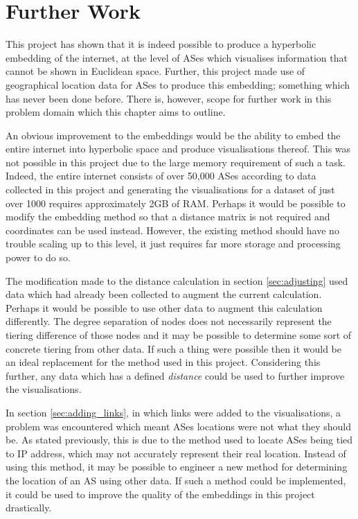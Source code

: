 \chapter{Further Work}

This project has shown that it is indeed possible to produce a hyperbolic embedding of the internet, at the level of ASes which visualises information that cannot be shown in Euclidean space. Further, this project made use of geographical location data for ASes to produce this embedding; something which has never been done before. There is, however, scope for further work in this problem domain which this chapter aims to outline. 

An obvious improvement to the embeddings would be the ability to embed the entire internet into hyperbolic space and produce visualisations thereof. This was not possible in this project due to the large memory requirement of such a task. Indeed, the entire internet consists of over 50,000 ASes according to data collected in this project and generating the visualisations for a dataset of just over 1000 requires approximately 2GB of RAM. Perhaps it would be possible to modify the embedding method so that a distance matrix is not required and coordinates can be used instead. However, the existing method should have no trouble scaling up to this level, it just requires far more storage and processing power to do so.

The modification made to the distance calculation in section \ref{sec:adjusting} used data which had already been collected to augment the current calculation. Perhaps it would be possible to use other data to augment this calculation differently. The degree separation of nodes does not necessarily represent the tiering difference of those nodes and it may be possible to determine some sort of concrete tiering from other data. If such a thing were possible then it would be an ideal replacement for the method used in this project. Considering this further, any data which has a defined \textit{distance} could be used to further improve the visualisations.

In section \ref{sec:adding_links}, in which links were added to the visualisations, a problem was encountered which meant ASes locations were not what they should be. As stated previously, this is due to the method used to locate ASes being tied to IP address, which may not accurately represent their real location. Instead of using this method, it may be possible to engineer a new method for determining the location of an AS using other data. If such a method could be implemented, it could be used to improve the quality of the embeddings in this project drastically. 